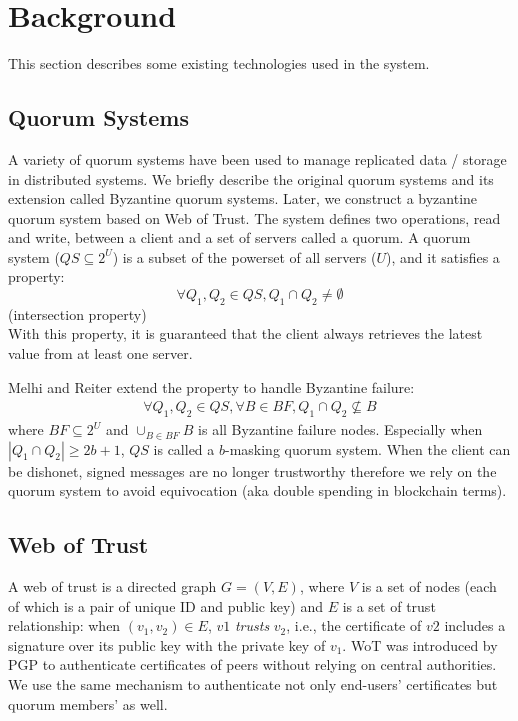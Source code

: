 \section{Background}
This section describes some existing technologies used in the system.

\subsection{Quorum Systems}
A variety of quorum systems have been used to manage replicated data /
storage in distributed systems. We briefly describe the original
quorum systems and its extension called Byzantine quorum
systems. Later, we construct a byzantine quorum system based on Web of
Trust.
The system defines two operations, {\sf read} and {\sf write}, between
a client and a set of servers called a quorum. A quorum system ($QS
\subseteq 2^U$) is a subset of the powerset of all servers ($U$), and
it satisfies a property:
\[
  \forall Q_1, Q_2 \in QS, Q_1 \cap Q_2 \neq \emptyset
\]
\hfill (intersection property)\\

With this property, it is guaranteed that the client always retrieves
the latest value from at least one server.

Melhi and Reiter \cite{Delhi:1} extend the property to handle
Byzantine failure:
\begin{align*}
  \forall Q_1, Q_2 \in QS, \forall B \in BF, Q_1 \cap Q_2 \nsubseteq B
\end{align*}
where $BF \subseteq 2^U$ and $\cup_{B \in BF} B$ is all Byzantine
failure nodes.
Especially when $|Q_1 \cap Q_2| \geq 2b+1$, $QS$ is called a $b$-masking
quorum system. When the client can be dishonet, signed messages are no
longer trustworthy therefore we rely on the quorum system to avoid
equivocation (aka double spending in blockchain terms).

\subsection{Web of Trust}
A web of trust is a directed graph $G = (V, E)$, where $V$ is a set of
nodes (each of which is a pair of unique ID and public key) and $E$ is a
set of trust relationship: when $(v_1, v_2) \in E$, $v1$ {\em trusts}
$v_2$,
i.e., the certificate of $v2$ includes a signature over its public key
with the private key of $v_1$. WoT was introduced by PGP to
authenticate certificates of peers without relying on central
authorities. We use the same mechanism to authenticate not only
end-users' certificates but quorum members' as well.

